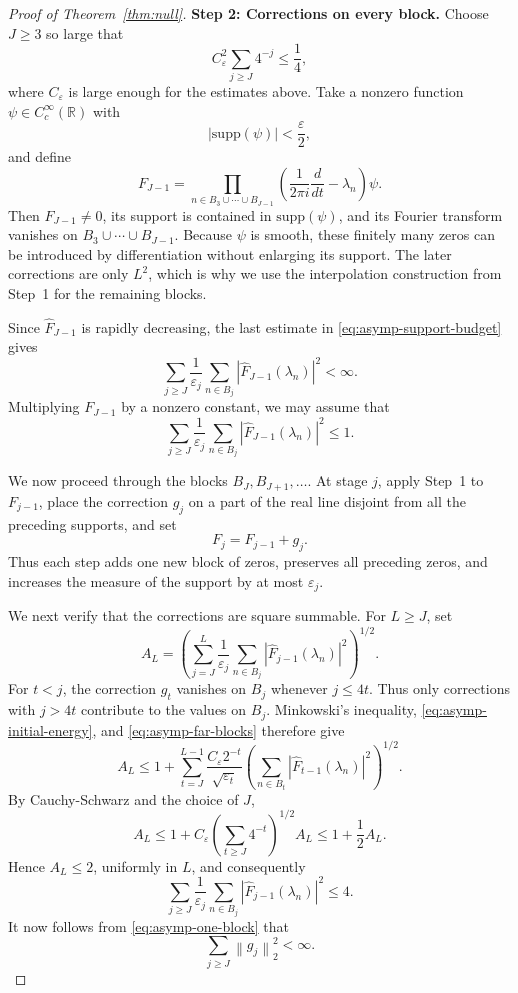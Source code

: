 \documentclass[reqno,a4paper,12pt]{amsart}
\numberwithin{equation}{section}
\def\R{{\mathbb R}}
\newcommand{\supp}{{\mathrm{supp}}}
\newcommand\1{\mathds{1}}
\newcommand{\norm}[1]{\left\lVert #1 \right\rVert}
\begin{document}
\begin{proof}[Proof of Theorem~\ref{thm:null}]
\noindent\textbf{Step 2: Corrections on every block.}
Choose \(J\geq3\) so large that
\[
    C_\varepsilon^2\sum_{j\geq J}4^{-j}\leq\frac14,
\]
where \(C_\varepsilon\) is large enough for the estimates above. Take
a nonzero function \(\psi\in C_c^\infty(\R)\) with
\[
    |\supp(\psi)|<\frac{\varepsilon}{2},
\]
and define
\[
    F_{J-1}
    =
    \prod_{n\in B_3\cup\cdots\cup B_{J-1}}
    \left(\frac1{2\pi i}\frac{d}{dt}-\lambda_n\right)\psi.
\]
Then \(F_{J-1}\neq0\), its support is contained in \(\supp(\psi)\), and
its Fourier transform vanishes on
\(B_3\cup\cdots\cup B_{J-1}\). Because \(\psi\) is smooth, these
finitely many zeros can be introduced by differentiation without
enlarging its support. The later corrections are only \(L^2\), which
is why we use the interpolation construction from Step~1 for the
remaining blocks.

Since \(\widehat F_{J-1}\) is rapidly decreasing, the last estimate in
\eqref{eq:asymp-support-budget} gives
\[
    \sum_{j\geq J}\frac1{\varepsilon_j}
    \sum_{n\in B_j}
    |\widehat F_{J-1}(\lambda_n)|^2<\infty.
\]
Multiplying \(F_{J-1}\) by a nonzero constant, we may assume that
\begin{equation}\label{eq:asymp-initial-energy}
    \sum_{j\geq J}\frac1{\varepsilon_j}
    \sum_{n\in B_j}
    |\widehat F_{J-1}(\lambda_n)|^2\leq1.
\end{equation}

We now proceed through the blocks \(B_J,B_{J+1},\ldots\). At stage
\(j\), apply Step~1 to \(F_{j-1}\), place the correction \(g_j\) on a
part of the real line disjoint from all the preceding supports, and set
\[
    F_j=F_{j-1}+g_j.
\]
Thus each step adds one new block of zeros, preserves all preceding
zeros, and increases the measure of the support by at most
\(\varepsilon_j\).

We next verify that the corrections are square summable. For \(L\geq J\),
set
\[
    A_L=
    \left(
        \sum_{j=J}^{L}\frac1{\varepsilon_j}
        \sum_{n\in B_j}
        |\widehat F_{j-1}(\lambda_n)|^2
    \right)^{1/2}.
\]
For \(t<j\), the correction \(g_t\) vanishes on \(B_j\) whenever
\(j\leq4t\). Thus only corrections with \(j>4t\) contribute to the
values on \(B_j\). Minkowski's inequality,
\eqref{eq:asymp-initial-energy}, and
\eqref{eq:asymp-far-blocks} therefore give
\[
    A_L
    \leq
    1+
    \sum_{t=J}^{L-1}
    \frac{C_\varepsilon2^{-t}}{\sqrt{\varepsilon_t}}
    \left(
        \sum_{n\in B_t}
        |\widehat F_{t-1}(\lambda_n)|^2
    \right)^{1/2}.
\]
By Cauchy-Schwarz and the choice of \(J\),
\[
    A_L
    \leq
    1+
    C_\varepsilon
    \left(\sum_{t\geq J}4^{-t}\right)^{1/2}A_L
    \leq1+\frac12A_L.
\]
Hence \(A_L\leq2\), uniformly in \(L\), and consequently
\[
    \sum_{j\geq J}\frac1{\varepsilon_j}
    \sum_{n\in B_j}
    |\widehat F_{j-1}(\lambda_n)|^2
    \leq4.
\]
It now follows from \eqref{eq:asymp-one-block} that
\[
    \sum_{j\geq J}\norm{g_j}_2^2<\infty.
\]


\end{proof}
\end{document}

